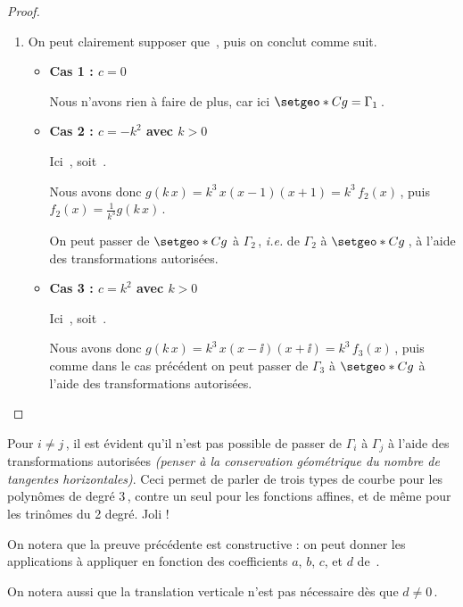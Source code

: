 \begin{proof}
\begin{enumerate}


		\item On peut clairement supposer que \,, puis on conclut comme suit.
		\begin{itemize}
			\item \textbf{Cas 1 : $c = 0$}
		
			\smallskip
			\noindent
			Nous n'avons rien à faire de plus, car ici $\setgeo*{C}{g} = \Gamma_1$\,.


			\item \textbf{Cas 2 : $c = - k^2$ avec $k > 0$}
		
			\smallskip
			\noindent
			Ici
			\,,
			soit
			\,.
		
			\smallskip
			\noindent
			Nous avons donc $g(k \, x) = k^3 \, x(x - 1)(x + 1) = k^3 \, f_2(x)$\,,
			puis
			$f_2(x) = \frac{1}{k^3} g(k \, x)$\,.
		
			\smallskip
			\noindent
			On peut passer de $\setgeo*{C}{g}$ à $\Gamma_2$\,, \emph{i.e.} de $\Gamma_2$ à $\setgeo*{C}{g}$\,, à l'aide des transformations autorisées.


			\item \textbf{Cas 3 : $c = k^2$ avec $k > 0$}
		
			\smallskip
			\noindent
			Ici
			\,,
			soit
			\,.
		
			\smallskip
			\noindent
			Nous avons donc $g(k \, x) = k^3 \, x(x - \ii)(x + \ii) = k^3 \, f_3(x)$\,,
			puis comme dans le cas précédent on peut passer de $\Gamma_3$ à $\setgeo*{C}{g}$ à l'aide des transformations autorisées.
		\end{itemize}
	\end{enumerate}
\end{proof}




Pour $i \neq j$\,, il est évident qu'il n'est pas possible de passer de $\Gamma_i$  à $\Gamma_j$ à l'aide des transformations autorisées \emph{(penser à la conservation géométrique du nombre de tangentes horizontales)}.
Ceci permet de parler de trois types de courbe pour les polynômes de degré $3$\,, contre un seul pour les fonctions affines, et de même pour les trinômes du 2\ieme{} degré. Joli !




\begin{remark}
	On notera que la preuve précédente est constructive : on peut donner les applications à appliquer en fonction des coefficients $a$, $b$, $c$, et $d$ de \,.
\end{remark}




\begin{remark}
	On notera aussi que la translation verticale n'est pas nécessaire dès que $d \neq 0$\,.
\end{remark}
